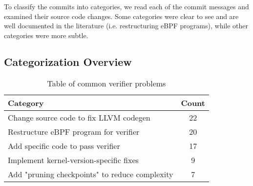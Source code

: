 
To classify the commits into categories, we read each of the commit messages and examined
    their source code changes.
Some categories were clear to see and are well documented in the literature (i.e. restructuring eBPF programs), while other categories were more subtle.


\subsection{Categorization Overview}

\begin{table}[t]
    \small
    \centering
    \begin{tabular}{lc}%
        \toprule
        \textbf{Category} & \textbf{Count} \\
        \midrule
        Change source code to fix LLVM codegen & 22 \\          %
        Restructure eBPF program for verifier & 20 \\           %
        Add specific code to pass verifier & 17 \\              %
        Implement kernel-version-specific fixes & 9 \\          %
        Add "pruning checkpoints" to reduce complexity & 7 \\   %
        \bottomrule
    \end{tabular}
    \caption{Table of common verifier problems}
    \label{fig:commit-table}
\end{table}

